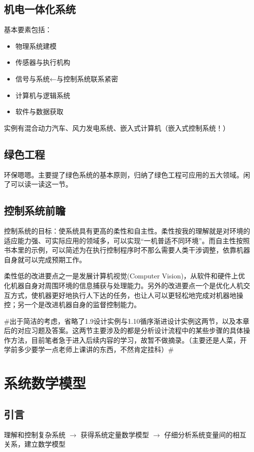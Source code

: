 \documentclass{NHNotebook}
\begin{document}
\section{机电一体化系统}
基本要素包括：
\begin{itemize}
    \item 物理系统建模
    \item 传感器与执行机构
    \item 信号与系统←\dag 与控制系统联系紧密
    \item 计算机与逻辑系统
    \item 软件与数据获取   
\end{itemize}
实例有混合动力汽车、风力发电系统、嵌入式计算机（嵌入式控制系统！）
\section{绿色工程}
环保嗯嗯。主要提了绿色系统的基本原则，归纳了绿色工程可应用的五大领域。闲了可以读一读这一节。

\section{控制系统前瞻}
控制系统的目标：使系统具有更高的柔性和自主性。柔性按我的理解就是对环境的适应能力强、可实际应用的领域多，可以实现“一机普适不同环境”。而自主性按照书本里的示例，可以简述为在执行控制程序时不那么需要人类干涉调整，依靠机器自身就可以完成预期工作。

柔性低的改进要点之一是发展计算机视觉(Computer Vision)，从软件和硬件上优化机器自身对周围环境的信息捕获与处理能力。另外的改进要点一个是优化人机交互方式，使机器更好地执行人下达的任务，也让人可以更轻松地完成对机器地操控；另一个是改进机器自身的监督控制能力。


\textcolor{black!35!}{\#出于简洁的考虑，省略了1.9设计实例与1.10循序渐进设计实例这两节，以及本章后的对应习题及答案。这两节主要涉及的都是分析设计流程中的某些步骤的具体操作方法，目前笔者急于进入后续内容的学习，故暂不做摘录。（主要还是人菜，开学前多少要学一点老师上课讲的东西，不然肯定挂科）\#}


\chapter{系统数学模型}
\section{引言}
理解和控制复杂系统 $\rightarrow$ 获得系统定量数学模型 $\rightarrow$ 仔细分析系统变量间的相互关系，建立数学模型 %
\end{document}
